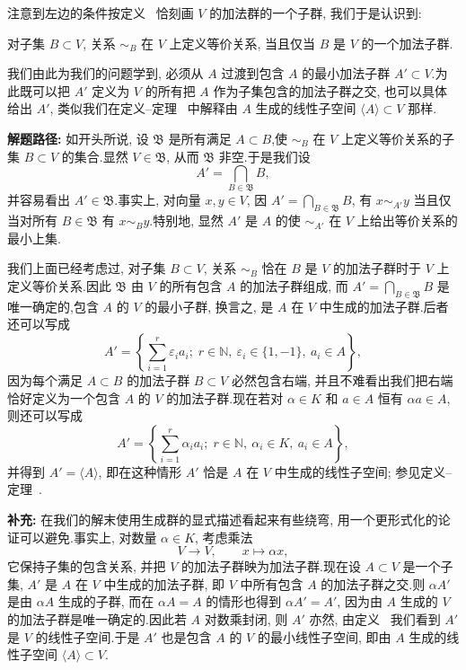 注意到左边的条件按定义~ 恰刻画 $V$ 的加法群的一个子群, 我们于是认识到:

对子集 $B \subset V$, 关系 $\sim_B$ 在 $V$ 上定义等价关系, 当且仅当 $B$ 是 $V$ 的一个加法子群.

我们由此为我们的问题学到, 必须从 $A$ 过渡到包含 $A$ 的最小加法子群 $A' \subset V$.为此既可以把 $A'$ 定义为 $V$ 的所有把 $A$ 作为子集包含的加法子群之交, 也可以具体给出 $A'$, 类似我们在定义--定理~ 中解释由 $A$ 生成的线性子空间 $\langle A \rangle \subset V$ 那样.

\noindent\textbf{解题路径:} 如开头所说, 设 $\mathfrak{B}$ 是所有满足 $A \subset B$,使 $\sim_B$ 在 $V$ 上定义等价关系的子集 $B \subset V$ 的集合.显然 $V \in \mathfrak{B}$, 从而 $\mathfrak{B}$ 非空.于是我们设
\[
A' = \bigcap_{B \in \mathfrak{B}} B,
\]
并容易看出 $A' \in \mathfrak{B}$.事实上, 对向量 $x, y \in V$, 因 $A' = \bigcap_{B \in \mathfrak{B}} B$, 有 $x \sim_{A'} y$ 当且仅当对所有 $B \in \mathfrak{B}$ 有 $x \sim_B y$.特别地, 显然 $A'$ 是 $A$ 的使 $\sim_{A'}$ 在 $V$ 上给出等价关系的最小上集.

我们上面已经考虑过, 对子集 $B \subset V$, 关系 $\sim_B$ 恰在 $B$ 是 $V$ 的加法子群时于 $V$ 上定义等价关系.因此 $\mathfrak{B}$ 由 $V$ 的所有包含 $A$ 的加法子群组成, 而 $A' = \bigcap_{B \in \mathfrak{B}} B$ 是唯一确定的,包含 $A$ 的 $V$ 的最小子群, 换言之, 是 $A$ 在 $V$ 中生成的加法子群.后者还可以写成
\[
A' = \left\{\sum_{i = 1}^{r} \varepsilon_i a_i;\; r \in \mathbb{N},\ \varepsilon_i \in \{1, -1\},\ a_i \in A \right\},
\]
因为每个满足 $A \subset B$ 的加法子群 $B \subset V$ 必然包含右端, 并且不难看出我们把右端恰好定义为一个包含 $A$ 的 $V$ 的加法子群.现在若对 $\alpha \in K$ 和 $a \in A$ 恒有 $\alpha a \in A$, 则还可以写成
\[
A' = \left\{\sum_{i = 1}^{r} \alpha_i a_i;\; r \in \mathbb{N},\ \alpha_i \in K,\ a_i \in A \right\},
\]
并得到 $A' = \langle A \rangle$, 即在这种情形 $A'$ 恰是 $A$ 在 $V$ 中生成的线性子空间; 参见定义--定理~.

\noindent\textbf{补充:} 在我们的解末使用生成群的显式描述看起来有些绕弯, 用一个更形式化的论证可以避免.事实上, 对数量 $\alpha \in K$, 考虑乘法
\[
V \longrightarrow V, \qquad x \longmapsto \alpha x,
\]
它保持子集的包含关系, 并把 $V$ 的加法子群映为加法子群.现在设 $A \subset V$ 是一个子集, $A'$ 是 $A$ 在 $V$ 中生成的加法子群, 即 $V$ 中所有包含 $A$ 的加法子群之交.则 $\alpha A'$ 是由 $\alpha A$ 生成的子群, 而在 $\alpha A = A$ 的情形也得到 $\alpha A' = A'$, 因为由 $A$ 生成的 $V$ 的加法子群是唯一确定的.因此若 $A$ 对数乘封闭, 则 $A'$ 亦然, 由定义~ 我们看到 $A'$ 是 $V$ 的线性子空间.于是 $A'$ 也是包含 $A$ 的 $V$ 的最小线性子空间, 即由 $A$ 生成的线性子空间 $\langle A \rangle \subset V$.

